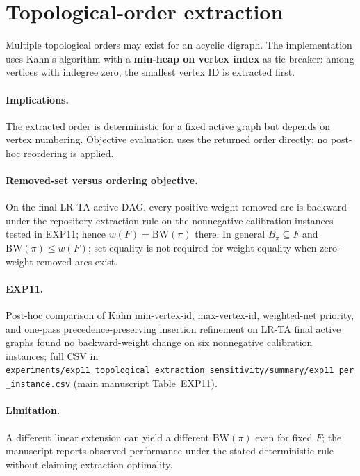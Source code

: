 \section{Topological-order extraction}
\label{sec:or1-topo}

Multiple topological orders may exist for an acyclic digraph. The implementation uses Kahn's algorithm with a \textbf{min-heap on vertex index} as tie-breaker: among vertices with indegree zero, the smallest vertex ID is extracted first.

\paragraph{Implications.} The extracted order is deterministic for a fixed active graph but depends on vertex numbering. Objective evaluation uses the returned order directly; no post-hoc reordering is applied.

\paragraph{Removed-set versus ordering objective.} On the final LR-TA active DAG, every positive-weight removed arc is backward under the repository extraction rule on the nonnegative calibration instances tested in EXP11; hence $w(F)=\mathrm{BW}(\pi)$ there. In general $B_\pi\subseteq F$ and $\mathrm{BW}(\pi)\le w(F)$; set equality is not required for weight equality when zero-weight removed arcs exist.

\paragraph{EXP11.} Post-hoc comparison of Kahn min-vertex-id, max-vertex-id, weighted-net priority, and one-pass precedence-preserving insertion refinement on LR-TA final active graphs found no backward-weight change on six nonnegative calibration instances; full CSV in \texttt{experiments/exp11\_topological\_extraction\_sensitivity/summary/exp11\_per\_instance.csv} (main manuscript Table~EXP11).

\paragraph{Limitation.} A different linear extension can yield a different $\mathrm{BW}(\pi)$ even for fixed $F$; the manuscript reports observed performance under the stated deterministic rule without claiming extraction optimality.
